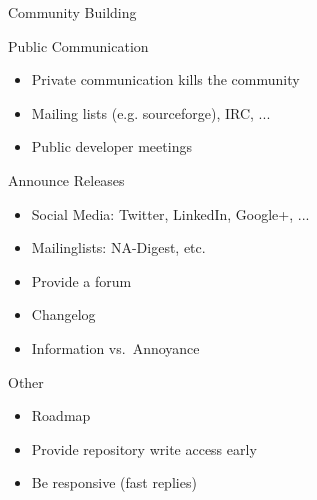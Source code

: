 \begin{frame}[fragile]{Community Building}

 \begin{block}{Public Communication}
  \begin{itemize}
   \item Private communication kills the community
   \item Mailing lists (e.g. sourceforge), IRC, ...
   \item Public developer meetings
  \end{itemize}
 \end{block}

 \begin{block}{Announce Releases}
  \begin{itemize}
   \item Social Media: Twitter, LinkedIn, Google+, ...
   \item Mailinglists: NA-Digest, etc.
   \item Provide a forum
   \item Changelog
   \item Information vs.~Annoyance
  \end{itemize}
 \end{block}

 
 \begin{block}{Other}
  \begin{itemize}
   \item Roadmap
   \item Provide repository write access early
   \item Be responsive (fast replies)
  \end{itemize}
 \end{block}
 

\end{frame}

